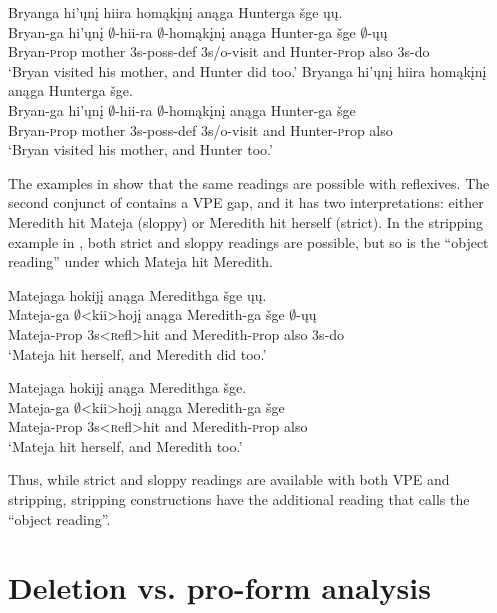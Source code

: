 \documentclass[output=paper]{LSP/langsci}
\begin{document}
\ea\label{ex:johnson:44}
\ea\label{ex:johnson:44a}
\glll Bryanga hi'ųnį hiira homąkįnį anąga Hunterga šge ųų.\\
Bryan-ga hi'ųnį $\emptyset$-hii-ra $\emptyset$-homąkįnį anąga Hunter-ga šge $\emptyset$-ųų\\
Bryan-{\textsc prop} mother {\textsc 3s-poss-def} {\textsc 3s/o}-visit and Hunter-{\textsc prop} also {\textsc 3s}-do\\
\trans `Bryan visited his mother, and Hunter did too.'
\ex\label{ex:johnson:44b}
\glll Bryanga hi'ųnį hiira homąkįnį anąga Hunterga šge.\\
Bryan-ga hi'ųnį $\emptyset$-hii-ra $\emptyset$-homąkįnį anąga Hunter-ga šge\\
Bryan-{\textsc prop} mother {\textsc 3s-poss-def} {\textsc 3s/o}-visit and Hunter-{\textsc prop} also\\
\trans `Bryan visited his mother, and Hunter too.'
\z
\z

The examples in  show that the same readings are possible with reflexives. The second conjunct of  contains a VPE gap, and it has two interpretations: either Meredith hit Mateja (sloppy) or Meredith hit herself (strict). In the stripping example in , both strict and sloppy readings are possible, but so is the ``object reading'' under which Mateja hit Meredith.

\ea\label{ex:johnson:45}
\ea\label{ex:johnson:45a}
\glll Matejaga hokijį anąga Meredithga šge ųų.\\
Mateja-ga $\emptyset$<kii>hojį anąga Meredith-ga šge $\emptyset$-ųų\\
Mateja-{\textsc prop} {\textsc 3s}<{\textsc refl}>hit and Meredith-{\textsc prop} also {\textsc 3s}-do\\
\trans `Mateja hit herself, and Meredith did too.'

\ex\label{ex:johnson:45b}
\glll Matejaga hokijį anąga Meredithga šge.\\
Mateja-ga $\emptyset$<kii>hojį anąga Meredith-ga šge\\ 
Mateja-{\textsc prop} {\textsc 3s}<{\textsc refl}>hit and Meredith-{\textsc prop} also\\ 
\trans `Mateja hit herself, and Meredith too.'
\z
\z

Thus, while strict and sloppy readings are available with both VPE and stripping, stripping constructions have the additional reading that \citealt{Fortin2007} calls the ``object reading''.


\section{Deletion vs. pro-form analysis}\label{sec:johnson:4}
\end{document}
